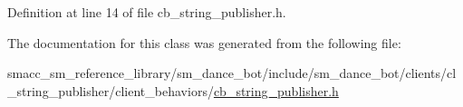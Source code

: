 Definition at line 14 of file cb\+\_\+string\+\_\+publisher.\+h.



The documentation for this class was generated from the following file\+:\begin{DoxyCompactItemize}
\item 
smacc\+\_\+sm\+\_\+reference\+\_\+library/sm\+\_\+dance\+\_\+bot/include/sm\+\_\+dance\+\_\+bot/clients/cl\+\_\+string\+\_\+publisher/client\+\_\+behaviors/\hyperlink{include_2sm__dance__bot_2clients_2cl__string__publisher_2client__behaviors_2cb__string__publisher_8h}{cb\+\_\+string\+\_\+publisher.\+h}\end{DoxyCompactItemize}
